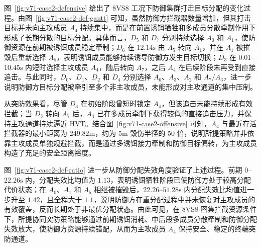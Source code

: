 

图~\ref{fig:v71-case2-defensive} 给出了 8VS8 工况下防御集群打击目标分配的变化过程。由图~\ref{fig:v71-case2-def-gantt} 可知，虽然防御方拦截器数量增加，但其打击目标并未向主攻成员 $A_4$ 持续集中，而是在前置诱饵牺牲和多成员分散牵制作用下形成了长期分散的目标分配。具体而言，$D_5$ 和 $D_7$ 分别持续选择 $A_0$ 和 $A_1$，使防御资源在前期被诱饵成员稳定牵制；$D_6$ 在 $12.14\mathrm{s}$ 由 $A_5$ 转向 $A_1$，并在 $A_1$ 被摧毁后重新选择 $A_5$，表明诱饵成员能够持续诱导防御方发生目标切换；$D_3$ 在 $0.01$--$10.45\mathrm{s}$ 内短时选择主攻成员 $A_4$，随后转向 $A_7$，之后 $A_4$ 在后续阶段未再受到直接追击。与此同时，$D_0$、$D_1$、$D_2$ 和 $D_4$ 分别选择 $A_6$、$A_3$、$A_2$ 和 $A_7/A_3$，进一步说明防御方目标分配被牵引至多个非主攻成员，未能形成对主攻通道的集中压制。

从突防效果看，尽管 $D_3$ 在初始阶段曾短时锁定 $A_4$，但该追击未能持续形成有效拦截；当 $D_3$ 转向 $A_7$ 后，$A_4$ 已在多成员牵制下获得较低的直接追击压力，并保持主攻通道持续逼近 HVT。结合图~\ref{fig:v71-case2-offensive} 可知，$A_4$ 与最近存活拦截器的最小距离为 $249.82\mathrm{m}$，约为 $5\mathrm{m}$ 毁伤半径的 $50$ 倍，说明所提策略并非依靠主攻成员单独规避拦截，而是通过多诱饵接力牵制和防御目标偏转，为主攻成员构造了充足的安全距离裕度。

图~\ref{fig:v71-case2-def-ratio} 进一步从防御分配失效角度验证了上述过程。前期 $0$--$22.26\mathrm{s}$ 内，分配失效比均值为 $1.13$，表明诱饵牺牲阶段已使防御方处于较高分配代价状态；在 $A_0$、$A_1$ 和 $A_5$ 相继被摧毁后，$22.26$--$51.28\mathrm{s}$ 内分配失效比均值进一步升至 $1.42$，且全程大于 $1.1$，说明防御方在重分配过程中并未恢复对主攻成员的有效覆盖，反而长期处于非最优分配状态。由此可见，在 8VS8 密集拦截资源条件下，所提协同突防策略能够通过前期诱饵消耗、中后段多成员分散牵制和防御分配失效放大，使防御方资源持续错配，从而为主攻成员 $A_4$ 保持安全、稳定的终端突防通道。




